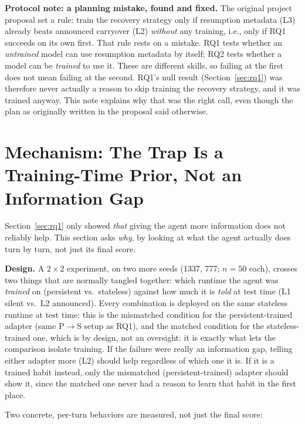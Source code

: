 \documentclass[11pt,a4paper]{article}
\begin{document}
\begin{protocolnote}
\textbf{Protocol note: a planning mistake, found and fixed.} The original project proposal set a
rule: train the recovery strategy only if resumption metadata (L3) already beats announced
carryover (L2) \emph{without} any training, i.e., only if RQ1 succeeds on its own first. That
rule rests on a mistake. RQ1 tests whether an \emph{untrained} model can use resumption metadata
by itself; RQ2 tests whether a model can be \emph{trained} to use it. These are different
skills, so failing at the first does not mean failing at the second. RQ1's null result
(Section~\ref{sec:rq1}) was therefore never actually a reason to skip training the recovery
strategy, and it was trained anyway. This note explains why that was the right call, even though
the plan as originally written in the proposal said otherwise.
\end{protocolnote}

\section{Mechanism: The Trap Is a Training-Time Prior, Not an Information Gap}
\label{sec:mechanism}

Section~\ref{sec:rq1} only showed \emph{that} giving the agent more information does not
reliably help. This section asks \emph{why}, by looking at what the agent actually does turn by
turn, not just its final score.

\textbf{Design.} A $2\times2$ experiment, on two more seeds (1337, 777; $n=50$ each), crosses two
things that are normally tangled together: which runtime the agent was \emph{trained} on
(persistent vs.\ stateless) against how much it is \emph{told} at test time (L1 silent vs.\ L2
announced). Every combination is deployed on the same stateless runtime at test time: this is
the mismatched condition for the persistent-trained adapter (same P$\to$S setup as RQ1), and the
matched condition for the stateless-trained one, which is by design, not an oversight: it is
exactly what lets the comparison isolate training. If the failure were really an information
gap, telling either adapter more (L2) should help regardless of which one it is. If it is a
trained habit instead, only the mismatched (persistent-trained) adapter should show it, since
the matched one never had a reason to learn that habit in the first place.

Two concrete, per-turn behaviors are measured, not just the final score:
\end{document}
